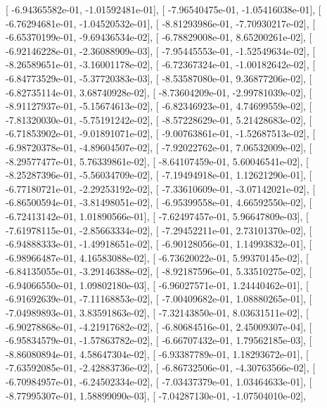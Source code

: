 \documentclass{article}
\begin{document}
       [ -6.94365582e-01,  -1.01592481e-01],
       [ -7.96540475e-01,  -1.05416038e-01],
       [ -6.76294681e-01,  -1.04520532e-01],
       [ -8.81293986e-01,  -7.70930217e-02],
       [ -6.65370199e-01,  -9.69436534e-02],
       [ -6.78829008e-01,   8.65200261e-02],
       [ -6.92146228e-01,  -2.36088909e-03],
       [ -7.95445553e-01,  -1.52549634e-02],
       [ -8.26589651e-01,  -3.16001178e-02],
       [ -6.72367324e-01,  -1.00182642e-02],
       [ -6.84773529e-01,  -5.37720383e-03],
       [ -8.53587080e-01,   9.36877206e-02],
       [ -6.82735114e-01,   3.68740928e-02],
       [ -8.73604209e-01,  -2.99781039e-02],
       [ -8.91127937e-01,  -5.15674613e-02],
       [ -6.82346923e-01,   4.74699559e-02],
       [ -7.81320030e-01,  -5.75191242e-02],
       [ -8.57228629e-01,   5.21428683e-02],
       [ -6.71853902e-01,  -9.01891071e-02],
       [ -9.00763861e-01,  -1.52687513e-02],
       [ -6.98720378e-01,  -4.89604507e-02],
       [ -7.92022762e-01,   7.06532009e-02],
       [ -8.29577477e-01,   5.76339861e-02],
       [ -8.64107459e-01,   5.60046541e-02],
       [ -8.25287396e-01,  -5.56034709e-02],
       [ -7.19494918e-01,   1.12621290e-01],
       [ -6.77180721e-01,  -2.29253192e-02],
       [ -7.33610609e-01,  -3.07142021e-02],
       [ -6.86500594e-01,  -3.81498051e-02],
       [ -6.95399558e-01,   4.66592550e-02],
       [ -6.72413142e-01,   1.01890566e-01],
       [ -7.62497457e-01,   5.96647809e-03],
       [ -7.61978115e-01,  -2.85663334e-02],
       [ -7.29452211e-01,   2.73101370e-02],
       [ -6.94888333e-01,  -1.49918651e-02],
       [ -6.90128056e-01,   1.14993832e-01],
       [ -6.98966487e-01,   4.16583088e-02],
       [ -6.73620022e-01,   5.99370145e-02],
       [ -6.84135055e-01,  -3.29146388e-02],
       [ -8.92187596e-01,   5.33510275e-02],
       [ -6.94066550e-01,   1.09802180e-03],
       [ -6.96027571e-01,   1.24440462e-01],
       [ -6.91692639e-01,  -7.11168853e-02],
       [ -7.00409682e-01,   1.08880265e-01],
       [ -7.04989893e-01,   3.83591863e-02],
       [ -7.32143850e-01,   8.03631511e-02],
       [ -6.90278868e-01,  -4.21917682e-02],
       [ -6.80684516e-01,   2.45009307e-04],
       [ -6.95834579e-01,  -1.57863782e-02],
       [ -6.66707432e-01,   1.79562185e-03],
       [ -8.86080894e-01,   4.58647304e-02],
       [ -6.93387789e-01,   1.18293672e-01],
       [ -7.63592085e-01,  -2.42883736e-02],
       [ -6.86732506e-01,  -4.30763566e-02],
       [ -6.70984957e-01,  -6.24502334e-02],
       [ -7.03437379e-01,   1.03464633e-01],
       [ -8.77995307e-01,   1.58899090e-03],
       [ -7.04287130e-01,  -1.07504010e-02],
\end{document}
